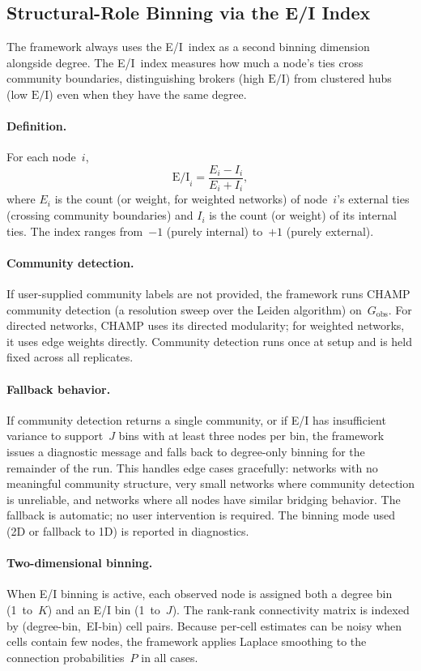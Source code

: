 \documentclass[11pt]{article}
\newcommand{\Gobs}{G_{\text{obs}}}
\newcommand{\EI}{\text{E/I}}
\begin{document}
\subsection{Structural-Role Binning via the E/I Index}

The framework always uses the E/I~index as a second binning dimension alongside degree. The E/I~index measures how much a node's ties cross community boundaries, distinguishing brokers (high $\EI$) from clustered hubs (low $\EI$) even when they have the same degree.

\paragraph{Definition.} For each node~$i$,
\[
\EI_i = \frac{E_i - I_i}{E_i + I_i},
\]
where $E_i$ is the count (or weight, for weighted networks) of node~$i$'s external ties (crossing community boundaries) and $I_i$ is the count (or weight) of its internal ties. The index ranges from~$-1$ (purely internal) to~$+1$ (purely external).

\paragraph{Community detection.} If user-supplied community labels are not provided, the framework runs CHAMP community detection (a resolution sweep over the Leiden algorithm) on~$\Gobs$. For directed networks, CHAMP uses its directed modularity; for weighted networks, it uses edge weights directly. Community detection runs once at setup and is held fixed across all replicates.

\paragraph{Fallback behavior.} If community detection returns a single community, or if E/I has insufficient variance to support~$J$ bins with at least three nodes per bin, the framework issues a diagnostic message and falls back to degree-only binning for the remainder of the run. This handles edge cases gracefully: networks with no meaningful community structure, very small networks where community detection is unreliable, and networks where all nodes have similar bridging behavior. The fallback is automatic; no user intervention is required. The binning mode used (2D or fallback to 1D) is reported in diagnostics.

\paragraph{Two-dimensional binning.} When E/I binning is active, each observed node is assigned both a degree bin (1~to~$K$) and an E/I bin (1~to~$J$). The rank-rank connectivity matrix is indexed by (degree-bin,~EI-bin) cell pairs. Because per-cell estimates can be noisy when cells contain few nodes, the framework applies Laplace smoothing to the connection probabilities~$P$ in all cases.
\end{document}
